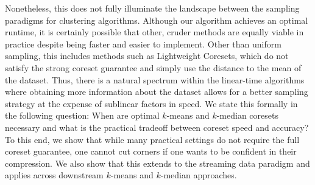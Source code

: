 Nonetheless, this does not fully illuminate the landscape between the sampling paradigms for clustering algorithms. Although our algorithm achieves an optimal
runtime, it is certainly possible that other, cruder methods are equally viable in practice despite being faster and easier to implement. Other than uniform
sampling, this includes methods such as Lightweight Coresets, which do not satisfy the strong coreset guarantee and simply use the distance to the mean
of the dataset. Thus, there is a natural spectrum within the linear-time algorithms where obtaining more information about the dataset allows for a better
sampling strategy at the expense of sublinear factors in speed. We state this formally in the following question: When are optimal $k$-means and $k$-median
coresets necessary and what is the practical tradeoff between coreset speed and accuracy? To this end, we show that while many practical settings do not require
the full coreset guarantee, one cannot cut corners if one wants to be confident in their compression. We also
show that this extends to the streaming data paradigm and applies across downstream $k$-means and $k$-median approaches.
